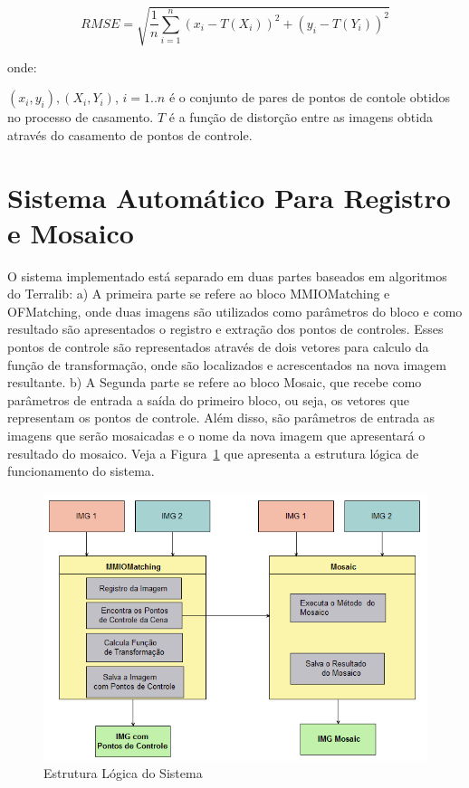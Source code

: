 \documentclass[9pt, a4paper, nofonttune, journal]{IEEEtran}
\begin{document}
$$
	RMSE = \sqrt{\frac{1}{n}\sum\limits_{i=1}^{n}(x_i - T(X_i))^2 + (y_i - T(Y_i))^2}
$$

onde:

$(x_i, y_i), (X_i, Y_i)$, $i = 1..n$ é o conjunto de pares de pontos de contole obtidos no processo de casamento.
$T$ é a função de distorção entre as imagens obtida através do casamento de pontos de controle.

\section{ Sistema Automático Para Registro e Mosaico }
 
O sistema implementado está separado em duas partes baseados em algoritmos do Terralib: a) A primeira parte se refere ao bloco MMIOMatching e OFMatching, onde duas imagens são utilizados como parâmetros do bloco e como resultado são apresentados o registro e extração dos pontos de controles. Esses pontos de controle são representados através de dois vetores para calculo da função de transformação, onde são localizados e acrescentados na nova imagem resultante. b) A Segunda parte se refere ao bloco Mosaic, que recebe como parâmetros de entrada a saída do primeiro bloco, ou seja, os vetores  que representam os pontos de controle. Além disso, são parâmetros de entrada as imagens que serão mosaicadas e o nome da nova imagem que apresentará o resultado do mosaico. Veja a Figura~\ref{fig:estrutura_logica} que apresenta a estrutura lógica de funcionamento do sistema.

\begin{figure}[h!t]
\begin{center}
\includegraphics[scale=0.50]{figuras/estrutura_logica}
\caption{Estrutura Lógica do Sistema}
\label{fig:estrutura_logica}
\end{center} 
\end{figure}
\end{document}
